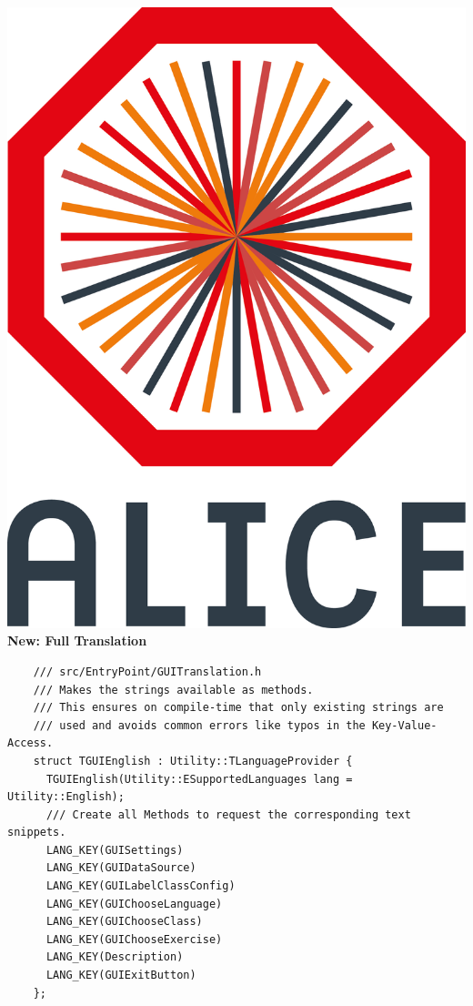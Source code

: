 \documentclass[aspectratio=169,14pt,dvipsnames]{beamer}
\begin{document}
\begin{frame}[fragile]{\includegraphics[height=0.07\textheight]{2012-Jul-04-4_Color_Logo_CB.png} \hspace{0.2cm}\textbf{New: Full Translation}}
  \begin{verbatim}
    /// src/EntryPoint/GUITranslation.h
    /// Makes the strings available as methods.
    /// This ensures on compile-time that only existing strings are
    /// used and avoids common errors like typos in the Key-Value-Access.
    struct TGUIEnglish : Utility::TLanguageProvider {
      TGUIEnglish(Utility::ESupportedLanguages lang = Utility::English);
      /// Create all Methods to request the corresponding text snippets.
      LANG_KEY(GUISettings)
      LANG_KEY(GUIDataSource)
      LANG_KEY(GUILabelClassConfig)
      LANG_KEY(GUIChooseLanguage)
      LANG_KEY(GUIChooseClass)
      LANG_KEY(GUIChooseExercise)
      LANG_KEY(Description)
      LANG_KEY(GUIExitButton)
    };
  \end{verbatim}
\end{frame}
\end{document}
